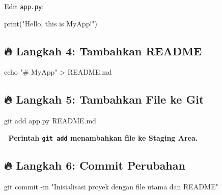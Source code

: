 \documentclass[
  letterpaper,
  DIV=11,
  numbers=noendperiod]{scrreprt}
\newenvironment{Shaded}{\begin{snugshade}}{\end{snugshade}}
\newcommand{\AttributeTok}[1]{\textcolor[rgb]{0.40,0.45,0.13}{#1}}
\newcommand{\BuiltInTok}[1]{\textcolor[rgb]{0.00,0.23,0.31}{#1}}
\newcommand{\FunctionTok}[1]{\textcolor[rgb]{0.28,0.35,0.67}{#1}}
\newcommand{\NormalTok}[1]{\textcolor[rgb]{0.00,0.23,0.31}{#1}}
\newcommand{\OperatorTok}[1]{\textcolor[rgb]{0.37,0.37,0.37}{#1}}
\newcommand{\StringTok}[1]{\textcolor[rgb]{0.13,0.47,0.30}{#1}}
\begin{document}
Edit \texttt{app.py}:

\begin{Shaded}
\begin{Highlighting}[]
\BuiltInTok{print}\NormalTok{(}\StringTok{"Hello, this is MyApp!"}\NormalTok{)}
\end{Highlighting}
\end{Shaded}

\subsection{\texorpdfstring{🔥 \textbf{Langkah 4: Tambahkan
README}}{🔥 Langkah 4: Tambahkan README}}\label{langkah-4-tambahkan-readme}

\begin{Shaded}
\begin{Highlighting}[]
\BuiltInTok{echo} \StringTok{"\# MyApp"} \OperatorTok{\textgreater{}}\NormalTok{ README.md}
\end{Highlighting}
\end{Shaded}

\subsection{\texorpdfstring{🔥 \textbf{Langkah 5: Tambahkan File ke
Git}}{🔥 Langkah 5: Tambahkan File ke Git}}\label{langkah-5-tambahkan-file-ke-git}

\begin{Shaded}
\begin{Highlighting}[]
\FunctionTok{git}\NormalTok{ add app.py README.md}
\end{Highlighting}
\end{Shaded}

📌 \textbf{Perintah \texttt{git\ add} menambahkan file ke Staging Area.}

\subsection{\texorpdfstring{🔥 \textbf{Langkah 6: Commit
Perubahan}}{🔥 Langkah 6: Commit Perubahan}}\label{langkah-6-commit-perubahan}

\begin{Shaded}
\begin{Highlighting}[]
\FunctionTok{git}\NormalTok{ commit }\AttributeTok{{-}m} \StringTok{"Inisialisasi proyek dengan file utama dan README"}
\end{Highlighting}
\end{Shaded}
\end{document}
